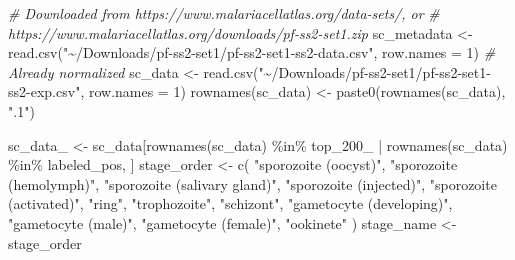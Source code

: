 \documentclass[
  11pt,
  oneside]{book}
\newenvironment{Shaded}{\begin{snugshade}}{\end{snugshade}}
\newcommand{\AttributeTok}[1]{\textcolor[rgb]{0.77,0.63,0.00}{#1}}
\newcommand{\CommentTok}[1]{\textcolor[rgb]{0.56,0.35,0.01}{\textit{#1}}}
\newcommand{\DecValTok}[1]{\textcolor[rgb]{0.00,0.00,0.81}{#1}}
\newcommand{\FunctionTok}[1]{\textcolor[rgb]{0.00,0.00,0.00}{#1}}
\newcommand{\NormalTok}[1]{#1}
\newcommand{\OtherTok}[1]{\textcolor[rgb]{0.56,0.35,0.01}{#1}}
\newcommand{\SpecialCharTok}[1]{\textcolor[rgb]{0.00,0.00,0.00}{#1}}
\newcommand{\StringTok}[1]{\textcolor[rgb]{0.31,0.60,0.02}{#1}}
\begin{document}
\begin{Shaded}
\begin{Highlighting}[]
\CommentTok{\# Downloaded from https://www.malariacellatlas.org/data{-}sets/, or}
\CommentTok{\# https://www.malariacellatlas.org/downloads/pf{-}ss2{-}set1.zip}
\NormalTok{sc\_metadata }\OtherTok{\textless{}{-}} \FunctionTok{read.csv}\NormalTok{(}\StringTok{"\textasciitilde{}/Downloads/pf{-}ss2{-}set1/pf{-}ss2{-}set1{-}ss2{-}data.csv"}\NormalTok{, }\AttributeTok{row.names =} \DecValTok{1}\NormalTok{)}
\CommentTok{\# Already normalized}
\NormalTok{sc\_data }\OtherTok{\textless{}{-}} \FunctionTok{read.csv}\NormalTok{(}\StringTok{"\textasciitilde{}/Downloads/pf{-}ss2{-}set1/pf{-}ss2{-}set1{-}ss2{-}exp.csv"}\NormalTok{, }\AttributeTok{row.names =} \DecValTok{1}\NormalTok{)}
\FunctionTok{rownames}\NormalTok{(sc\_data) }\OtherTok{\textless{}{-}} \FunctionTok{paste0}\NormalTok{(}\FunctionTok{rownames}\NormalTok{(sc\_data), }\StringTok{".1"}\NormalTok{)}

\NormalTok{sc\_data\_ }\OtherTok{\textless{}{-}}\NormalTok{ sc\_data[}\FunctionTok{rownames}\NormalTok{(sc\_data) }\SpecialCharTok{\%in\%}\NormalTok{ top\_200\_ }\SpecialCharTok{|} \FunctionTok{rownames}\NormalTok{(sc\_data) }\SpecialCharTok{\%in\%}\NormalTok{ labeled\_pos, ]}
\NormalTok{stage\_order }\OtherTok{\textless{}{-}} \FunctionTok{c}\NormalTok{(}
  \StringTok{"sporozoite (oocyst)"}\NormalTok{, }\StringTok{"sporozoite (hemolymph)"}\NormalTok{, }\StringTok{"sporozoite (salivary gland)"}\NormalTok{,}
  \StringTok{"sporozoite (injected)"}\NormalTok{, }\StringTok{"sporozoite (activated)"}\NormalTok{, }\StringTok{"ring"}\NormalTok{, }\StringTok{"trophozoite"}\NormalTok{, }\StringTok{"schizont"}\NormalTok{,}
  \StringTok{"gametocyte (developing)"}\NormalTok{, }\StringTok{"gametocyte (male)"}\NormalTok{, }\StringTok{"gametocyte (female)"}\NormalTok{, }\StringTok{"ookinete"}
\NormalTok{)}
\NormalTok{stage\_name }\OtherTok{\textless{}{-}}\NormalTok{ stage\_order}
\end{Highlighting}
\end{Shaded}
\end{document}
